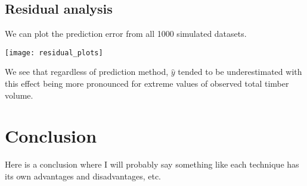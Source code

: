 \documentclass{article}
\begin{document}
\subsection{Residual analysis}

We can plot the prediction error from all 1000 simulated datasets.

\begin{center}
\texttt{[image: residual\_plots]}
\end{center}

We see that regardless of prediction method, $\hat{y}$ tended to be underestimated with this effect being more pronounced for extreme values of observed total timber volume.

\section{Conclusion}
Here is a conclusion where I will probably say something like each technique has its own advantages and disadvantages, etc.

\printbibliography
\end{document}
